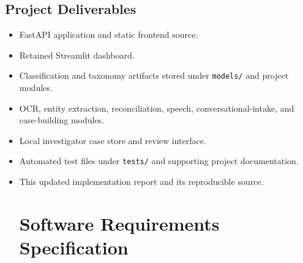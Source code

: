 \documentclass[12pt,a4paper,oneside]{report}
\begin{document}
\section{Project Deliverables}
\begin{itemize}
\item FastAPI application and static frontend source.
\item Retained Streamlit dashboard.
\item Classification and taxonomy artifacts stored under \texttt{models/} and project modules.
\item OCR, entity extraction, reconciliation, speech, conversational-intake, and case-building modules.
\item Local investigator case store and review interface.
\item Automated test files under \texttt{tests/} and supporting project documentation.
\item This updated implementation report and its reproducible source.
\clearpage\chapter{Software Requirements Specification}
\end{itemize}
\end{document}
